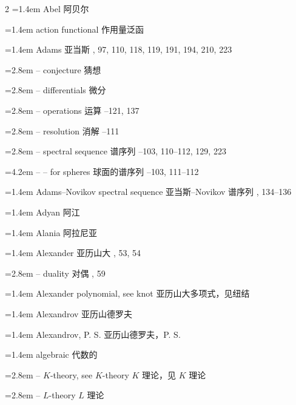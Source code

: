 \begin{multicols}{2}
\noindent\hangindent=1.4em Abel \quad 阿贝尔 \par
\noindent\hangindent=1.4em action functional \quad 作用量泛函 \par
\noindent\hangindent=1.4em Adams \quad 亚当斯 , 97, 110, 118, 119, 191, 194, 210, 223\par
\noindent\hangindent=2.8em -- conjecture \quad 猜想 \par
\noindent\hangindent=2.8em -- differentials \quad 微分 \par
\noindent\hangindent=2.8em -- operations \quad 运算 --121, 137\par
\noindent\hangindent=2.8em -- resolution \quad 消解 --111\par
\noindent\hangindent=2.8em -- spectral sequence \quad 谱序列 --103, 110--112, 129, 223\par
\noindent\hangindent=4.2em -- -- for spheres \quad 球面的谱序列 --103, 111--112\par
\noindent\hangindent=1.4em Adams--Novikov spectral sequence \quad 亚当斯--Novikov 谱序列 , 134--136\par
\noindent\hangindent=1.4em Adyan \quad 阿江 \par
\noindent\hangindent=1.4em Alania \quad 阿拉尼亚 \par
\noindent\hangindent=1.4em Alexander \quad 亚历山大 , 53, 54\par
\noindent\hangindent=2.8em -- duality \quad 对偶 , 59\par
\noindent\hangindent=1.4em Alexander polynomial, see knot \quad 亚历山大多项式，见纽结 \quad\par
\noindent\hangindent=1.4em Alexandrov \quad 亚历山德罗夫 \par
\noindent\hangindent=1.4em Alexandrov, P. S. \quad 亚历山德罗夫，P. S. \par
\noindent\hangindent=1.4em algebraic \quad 代数的 \quad\par
\noindent\hangindent=2.8em -- $K$-theory, see $K$-theory \quad $K$ 理论，见 $K$ 理论 \quad\par
\noindent\hangindent=2.8em -- $L$-theory \quad $L$ 理论 \par

\end{multicols}
